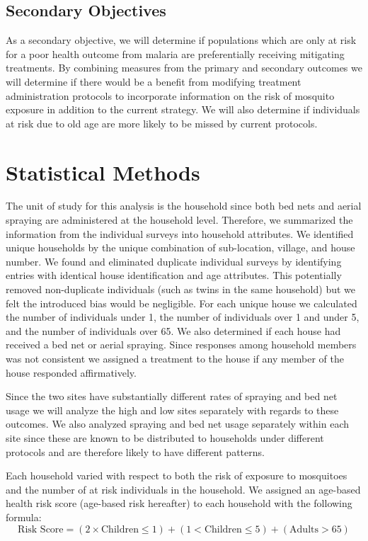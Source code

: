 \documentclass{article}\usepackage[]{graphicx}\usepackage[]{color}
\begin{document}
\subsection{Secondary Objectives}

As a secondary objective,  we will determine if populations which are only at risk for a poor health outcome from malaria are preferentially receiving mitigating treatments.  By combining measures from the primary and secondary outcomes we will determine if there would be a benefit from modifying treatment administration protocols to incorporate information on the risk of mosquito exposure in addition to the current strategy.  We will also determine if individuals at risk due to old age are more likely to be missed by current protocols.

\section{Statistical Methods}

The unit of study for this analysis is the household since both bed nets and aerial spraying are administered at the household level.  Therefore,  we summarized the information from the individual surveys into household attributes. We identified unique households by the unique combination of sub-location,  village,  and house number.  We found and eliminated duplicate individual surveys by identifying entries with identical house identification and age attributes.  This potentially removed non-duplicate individuals (such as twins in the same household) but we felt the introduced bias would be negligible.  For each unique house we calculated the number of individuals under 1,  the number of individuals over 1 and under 5,  and the number of individuals over 65.  We also determined if each house had received a bed net or aerial spraying.  Since responses among household members was not consistent we assigned a treatment to the house if any member of the house responded affirmatively.

Since the two sites have substantially different rates of spraying and bed net usage we will analyze the high and low sites separately with regards to these outcomes.  We also analyzed spraying and bed net usage separately within each site since these are known to be distributed to households under different protocols and are therefore likely to have different patterns.

Each household varied with respect to both the risk of exposure to mosquitoes and the number of at risk individuals in the household. We assigned an age-based health risk score (age-based risk hereafter) to each household with the following formula:
$$\text{Risk Score}  =  (2 \times \text{Children} \leq 1)+ (1 < \text{Children} \leq 5) + (\text{Adults} > 65)$$
\end{document}
